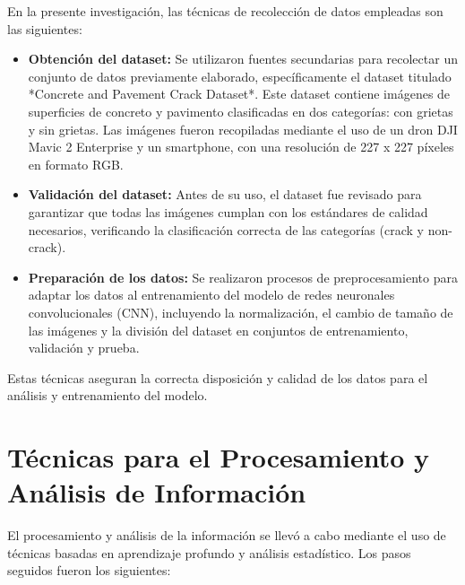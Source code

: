 En la presente investigación, las técnicas de recolección de datos empleadas son las siguientes:

\begin{itemize}
    \item \textbf{Obtención del dataset:} Se utilizaron fuentes secundarias para recolectar un conjunto de datos previamente elaborado, específicamente el dataset titulado *Concrete and Pavement Crack Dataset*. Este dataset contiene imágenes de superficies de concreto y pavimento clasificadas en dos categorías: con grietas y sin grietas. Las imágenes fueron recopiladas mediante el uso de un dron DJI Mavic 2 Enterprise y un smartphone, con una resolución de 227 x 227 píxeles en formato RGB.
    \item \textbf{Validación del dataset:} Antes de su uso, el dataset fue revisado para garantizar que todas las imágenes cumplan con los estándares de calidad necesarios, verificando la clasificación correcta de las categorías (crack y non-crack).
    \item \textbf{Preparación de los datos:} Se realizaron procesos de preprocesamiento para adaptar los datos al entrenamiento del modelo de redes neuronales convolucionales (CNN), incluyendo la normalización, el cambio de tamaño de las imágenes y la división del dataset en conjuntos de entrenamiento, validación y prueba.
\end{itemize}

Estas técnicas aseguran la correcta disposición y calidad de los datos para el análisis y entrenamiento del modelo.


\section{Técnicas para el Procesamiento y Análisis de Información}

El procesamiento y análisis de la información se llevó a cabo mediante el uso de técnicas basadas en aprendizaje profundo y análisis estadístico. Los pasos seguidos fueron los siguientes:

